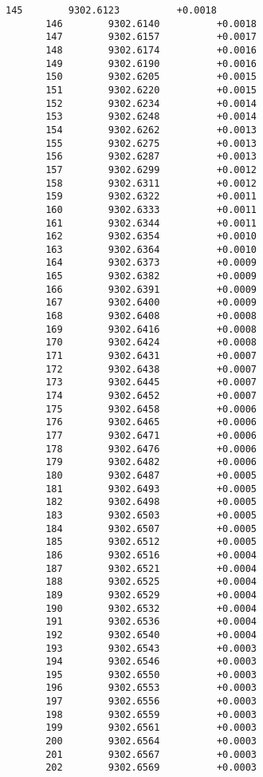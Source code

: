 \documentclass[11pt]{article}
\begin{document}
\begin{Verbatim}[commandchars=\\\{\}]
       145        9302.6123          +0.0018
       146        9302.6140          +0.0018
       147        9302.6157          +0.0017
       148        9302.6174          +0.0016
       149        9302.6190          +0.0016
       150        9302.6205          +0.0015
       151        9302.6220          +0.0015
       152        9302.6234          +0.0014
       153        9302.6248          +0.0014
       154        9302.6262          +0.0013
       155        9302.6275          +0.0013
       156        9302.6287          +0.0013
       157        9302.6299          +0.0012
       158        9302.6311          +0.0012
       159        9302.6322          +0.0011
       160        9302.6333          +0.0011
       161        9302.6344          +0.0011
       162        9302.6354          +0.0010
       163        9302.6364          +0.0010
       164        9302.6373          +0.0009
       165        9302.6382          +0.0009
       166        9302.6391          +0.0009
       167        9302.6400          +0.0009
       168        9302.6408          +0.0008
       169        9302.6416          +0.0008
       170        9302.6424          +0.0008
       171        9302.6431          +0.0007
       172        9302.6438          +0.0007
       173        9302.6445          +0.0007
       174        9302.6452          +0.0007
       175        9302.6458          +0.0006
       176        9302.6465          +0.0006
       177        9302.6471          +0.0006
       178        9302.6476          +0.0006
       179        9302.6482          +0.0006
       180        9302.6487          +0.0005
       181        9302.6493          +0.0005
       182        9302.6498          +0.0005
       183        9302.6503          +0.0005
       184        9302.6507          +0.0005
       185        9302.6512          +0.0005
       186        9302.6516          +0.0004
       187        9302.6521          +0.0004
       188        9302.6525          +0.0004
       189        9302.6529          +0.0004
       190        9302.6532          +0.0004
       191        9302.6536          +0.0004
       192        9302.6540          +0.0004
       193        9302.6543          +0.0003
       194        9302.6546          +0.0003
       195        9302.6550          +0.0003
       196        9302.6553          +0.0003
       197        9302.6556          +0.0003
       198        9302.6559          +0.0003
       199        9302.6561          +0.0003
       200        9302.6564          +0.0003
       201        9302.6567          +0.0003
       202        9302.6569          +0.0003

\end{Verbatim}
\end{document}
